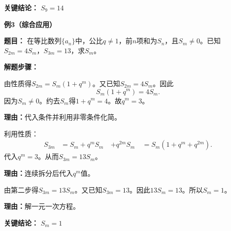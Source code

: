 \begin{examplebox}
	\textbf{\textcolor{CExample}{关键结论：}}
	\textbf{$S_9=14$}

	\medskip
	\textbf{\textcolor{CExample}{例3（综合应用）}}

	\textbf{\textcolor{CExample}{题目：}}
	在等比数列$\{a_n\}$中，公比$q\neq 1$，前$n$项和为$S_n$，且$S_m\neq 0$。已知$S_{2m}=4S_m$，$S_{3m}=13$，求$S_m$。

	\textbf{\textcolor{CExample}{解题步骤：}}
	\begin{description}[style=nextline, leftmargin=2.8em, labelsep=0.5em, itemsep=0.45em]
		\item[\textbf{第一步（求$q^m$）：}] 由性质得$S_{2m}=S_m(1+q^m)$。又已知$S_{2m}=4S_m$。因此
			\[
				S_m(1+q^m)=4S_m.
			\]
			因为$S_m\neq0$。约去$S_m$得$1+q^m=4$。故$q^m=3$。
			\par\textbf{理由：}代入条件并利用非零条件化简。
		\item[\textbf{第二步（表示$S_{3m}$）：}] 利用性质：
			\[
				\begin{aligned}
					S_{3m} &= S_m + q^m S_m \
					&
					+ q^{2m} S_m \
					&= S_m(1+q^m+q^{2m}).
			\end{aligned}
			\]
			代入$q^m=3$。从而$S_{3m}=13S_m$。
			\par\textbf{理由：}连续拆分后代入$q^m$值。
		\item[\textbf{第三步（列方程）：}] 由第二步得$S_{3m}=13S_m$。又已知$S_{3m}=13$。因此$13S_m=13$。所以$S_m=1$。
			\par\textbf{理由：}解一元一次方程。
	\end{description}

	\textbf{\textcolor{CExample}{关键结论：}}
	\textbf{$S_m=1$}
\end{examplebox}
